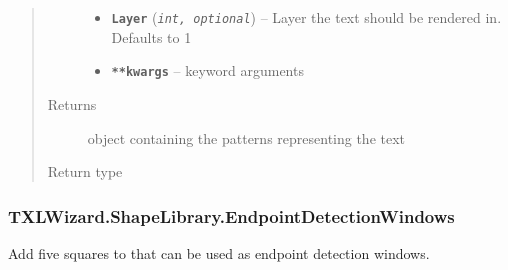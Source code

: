 \documentclass[letterpaper,10pt,english]{sphinxmanual}
\begin{document}
\begin{fulllineitems}
\begin{quote}
\begin{description}
\begin{itemize}
\item {} 
\textbf{\texttt{Layer}} (\emph{\texttt{int, optional}}) -- Layer the text should be rendered in.
Defaults to 1

\item {} 
\textbf{\texttt{**kwargs}} -- keyword arguments

\end{itemize}

\item[{Returns}] \leavevmode
{} object containing the patterns representing the text

\item[{Return type}] \leavevmode
{\hyperref[Chapters/PythonModuleReference/Patterns/TXLWizard.Patterns.Structure:TXLWizard.Patterns.Structure.Structure]{}}

\end{description}\end{quote}

\end{fulllineitems}



\subsubsection{TXLWizard.ShapeLibrary.EndpointDetectionWindows}
\label{Chapters/PythonModuleReference/ShapeLibrary/TXLWizard.ShapeLibrary.EndpointDetectionWindows:module-TXLWizard.ShapeLibrary.EndpointDetectionWindows}\label{Chapters/PythonModuleReference/ShapeLibrary/TXLWizard.ShapeLibrary.EndpointDetectionWindows::doc}\label{Chapters/PythonModuleReference/ShapeLibrary/TXLWizard.ShapeLibrary.EndpointDetectionWindows:txlwizard-shapelibrary-endpointdetectionwindows}
Add five squares to  that can be used as endpoint detection windows.
\end{document}
